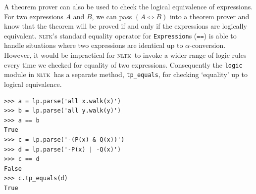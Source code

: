 \documentclass[11pt,a4paper]{article}
\newcommand{\NLTK}{\textsc{nltk}}
\newcommand{\dhgcode}[1]{{\tt #1}}
\begin{document}
A theorem prover can also be used to check the logical equivalence of
expressions.  For two expressions $A$ and $B$, we can pass $(A\iff B)$
into a theorem prover and know that the theorem will be proved if and
only if the expressions are logically equivalent.  \NLTK's standard
equality operator for \texttt{Expression}s (\texttt{==}) is able to
handle situations where two expressions are identical up to
$\alpha$-conversion.  However, it would be impractical for \NLTK\ to
invoke a wider range of logic rules every time we checked for equality
of two expressions. Consequently the \texttt{logic} module in \NLTK\
has a separate method, \dhgcode{tp\_equals}, for checking `equality'
up to logical equivalence.

\begin{verbatim}
>>> a = lp.parse('all x.walk(x)')
>>> b = lp.parse('all y.walk(y)')
>>> a == b
True
>>> c = lp.parse('-(P(x) & Q(x))')
>>> d = lp.parse('-P(x) | -Q(x)')
>>> c == d
False
>>> c.tp_equals(d)
True
\end{verbatim}



\end{document}
